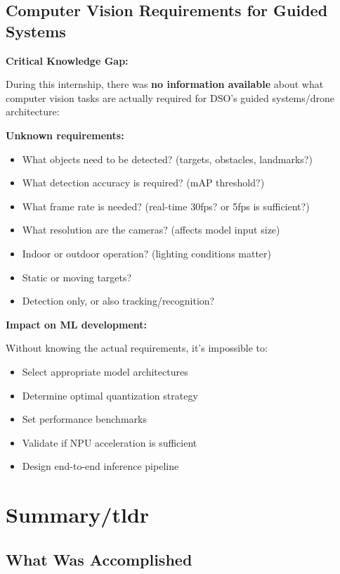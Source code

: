 \documentclass[12pt,a4paper]{report}
\begin{document}
\subsection{Computer Vision Requirements for Guided Systems}

\begin{important}
\textbf{Critical Knowledge Gap:}

During this internship, there was \textbf{no information available} about what computer vision tasks are actually required for DSO's guided systems/drone architecture:

\textbf{Unknown requirements:}
\begin{itemize}
    \item What objects need to be detected? (targets, obstacles, landmarks?)
    \item What detection accuracy is required? (mAP threshold?)
    \item What frame rate is needed? (real-time 30fps? or 5fps is sufficient?)
    \item What resolution are the cameras? (affects model input size)
    \item Indoor or outdoor operation? (lighting conditions matter)
    \item Static or moving targets?
    \item Detection only, or also tracking/recognition?
\end{itemize}

\textbf{Impact on ML development:}

Without knowing the actual requirements, it's impossible to:
\begin{itemize}
    \item Select appropriate model architectures
    \item Determine optimal quantization strategy
    \item Set performance benchmarks
    \item Validate if NPU acceleration is sufficient
    \item Design end-to-end inference pipeline
\end{itemize}


\end{important}

\section{Summary/tldr}

\subsection{What Was Accomplished}
\end{document}
